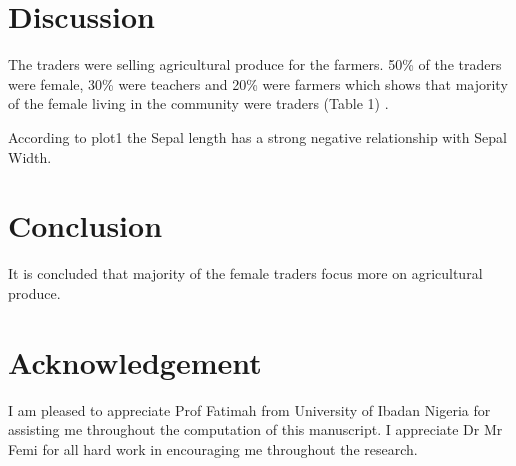 \documentclass[preprint, 3p,
authoryear]{elsarticle} %
\begin{document}
\hypertarget{discussion}{%
\section{Discussion}\label{discussion}}

The traders were selling agricultural produce for the farmers. 50\% of
the traders were female, 30\% were teachers and 20\% were farmers which
shows that majority of the female living in the community were traders
(Table 1) \citep{adebayo2020assessment}.

According to plot1 the Sepal length has a strong negative relationship
with Sepal Width.

\hypertarget{conclusion}{%
\section{Conclusion}\label{conclusion}}

It is concluded that majority of the female traders focus more on
agricultural produce.

\hypertarget{acknowledgement}{%
\section{Acknowledgement}\label{acknowledgement}}

I am pleased to appreciate Prof Fatimah from University of Ibadan
Nigeria for assisting me throughout the computation of this manuscript.
I appreciate Dr Mr Femi for all hard work in encouraging me throughout
the research.

\renewcommand\refname{References}

\end{document}
